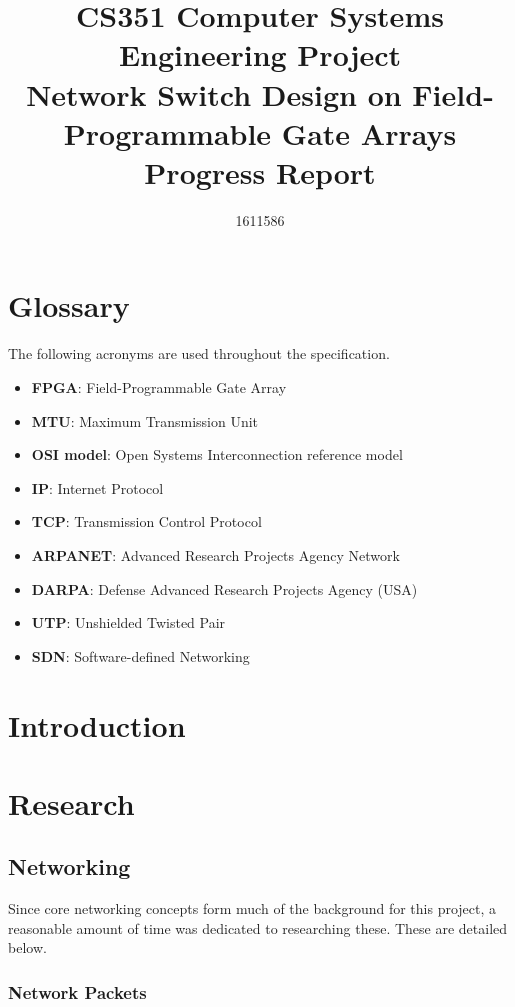 \documentclass[12pt, a4paper, twoside, onecolumn]{article}
\title{CS351 Computer Systems Engineering Project \\ \vspace{0.5cm} Network Switch Design on Field-Programmable Gate Arrays \\ \vspace{0.3cm} \Large{Progress Report}}
\author{1611586}
\begin{document}


\tableofcontents
\newpage

\section{Glossary}
\label{glossary}
The following acronyms are used throughout the specification.
\begin{itemize}
  \item \textbf{FPGA}: Field-Programmable Gate Array
  \item \textbf{MTU}: Maximum Transmission Unit
  \item \textbf{OSI model}: Open Systems Interconnection reference model
  \item \textbf{IP}: Internet Protocol
  \item \textbf{TCP}: Transmission Control Protocol
  \item \textbf{ARPANET}: Advanced Research Projects Agency Network
  \item \textbf{DARPA}: Defense Advanced Research Projects Agency (USA)
  \item \textbf{UTP}: Unshielded Twisted Pair
  \item \textbf{SDN}: Software-defined Networking
\end{itemize}

\section{Introduction}
\label{introduction}




\section{Research}
\label{research}

\subsection{Networking}
Since core networking concepts form much of the background for this project, a reasonable amount of time was dedicated to researching these. These are detailed below.

\subsubsection{Network Packets}
\label{network_packets}
\end{document}
